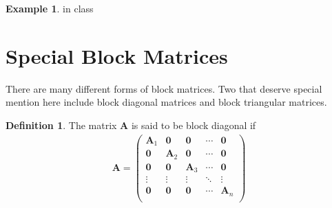 \documentclass[
]{book}
\theoremstyle{definition}
\newtheorem{definition}{Definition}[chapter]
\theoremstyle{definition}
\newtheorem{example}{Example}[chapter]
\theoremstyle{definition}
\theoremstyle{remark}
\begin{document}
\begin{example}
\protect\hypertarget{exm:unnamed-chunk-151}{}{\label{exm:unnamed-chunk-151} }in class
\end{example}

\hypertarget{special-block-matrices}{%
\section{Special Block Matrices}\label{special-block-matrices}}

There are many different forms of block matrices. Two that deserve special mention here include block diagonal matrices and block triangular matrices.

\begin{definition}
\protect\hypertarget{def:unnamed-chunk-152}{}{\label{def:unnamed-chunk-152} }The matrix \(\mathbf{A}\) is said to be block diagonal if
\[
\begin{aligned}
\mathbf{A} = \begin{pmatrix} 
\mathbf{A}_1 & \mathbf{0} & \mathbf{0} & \cdots & \mathbf{0} \\
\mathbf{0} & \mathbf{A}_2 & \mathbf{0} & \cdots & \mathbf{0} \\
\mathbf{0} & \mathbf{0} & \mathbf{A}_3 & \cdots & \mathbf{0} \\
\vdots & \vdots & \vdots & \ddots & \vdots \\
\mathbf{0} & \mathbf{0} & \mathbf{0} & \cdots & \mathbf{A}_n \\
\end{pmatrix}
\end{aligned}
\]\\
\end{definition}
\end{document}
